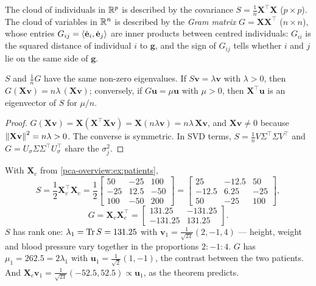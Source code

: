 \begin{notechapter}
The cloud of individuals in $\mathbb{R}^p$ is described by the covariance $S = \frac1n\mathbf X^\top\mathbf X$
($p\times p$). The cloud of variables in $\mathbb{R}^n$ is described by the \emph{Gram matrix}
$G = \mathbf X\mathbf X^\top$ ($n\times n$), whose entries $G_{ij} = \left\langle \dot{\mathbf e}_i, \dot{\mathbf e}_j \right\rangle$ are inner products
between centred individuals: $G_{ii}$ is the squared distance of individual $i$ to $\mathbf g$, and the sign of
$G_{ij}$ tells whether $i$ and $j$ lie on the same side of $\mathbf g$.

\begin{theorem}[Duality]\label{pca-overview:thm:duality}
$S$ and $\frac1nG$ have the same non-zero eigenvalues. If $S\mathbf v = \lambda\mathbf v$ with $\lambda>0$, then
$G(\mathbf X\mathbf v) = n\lambda\,(\mathbf X\mathbf v)$; conversely, if $G\mathbf u = \mu\mathbf u$ with $\mu>0$, then $\mathbf X^\top\mathbf u$ is an
eigenvector of $S$ for $\mu/n$.
\end{theorem}

\begin{proof}
$G(\mathbf X\mathbf v) = \mathbf X(\mathbf X^\top\mathbf X\mathbf v) = \mathbf X(n\lambda\mathbf v) = n\lambda\,\mathbf X\mathbf v$, and $\mathbf X\mathbf v\neq0$ because
$\left\|\mathbf X\mathbf v\right\|^2 = n\lambda>0$. The converse is symmetric. In SVD terms, $S = \frac1nV\Sigma^\top\Sigma V^\top$ and
$G = U_\sigma\Sigma\Sigma^\top U_\sigma^\top$ share the $\sigma_j^2$.
\end{proof}

\begin{example}
With $\mathbf X_c$ from \cref{pca-overview:ex:patients},
\[
  S = \frac12\mathbf X_c^\top\mathbf X_c = \frac12\begin{bmatrix}50 & -25 & 100\\ -25 & 12.5 & -50\\ 100 & -50 & 200\end{bmatrix}
    = \begin{bmatrix}25 & -12.5 & 50\\ -12.5 & 6.25 & -25\\ 50 & -25 & 100\end{bmatrix},
\]
\[
  G = \mathbf X_c\mathbf X_c^\top = \begin{bmatrix}131.25 & -131.25\\ -131.25 & 131.25\end{bmatrix}.
\]
$S$ has rank one: $\lambda_1 = \operatorname{Tr} S = 131.25$ with $\mathbf v_1 = \frac1{\sqrt{21}}(2,-1,4)$ --- height, weight and
blood pressure vary together in the proportions $2:-1:4$. $G$ has $\mu_1 = 262.5 = 2\lambda_1$ with
$\mathbf u_1 = \frac1{\sqrt2}(1,-1)$, the contrast between the two patients. And
$\mathbf X_c\mathbf v_1 = \frac1{\sqrt{21}}(-52.5, 52.5)\propto\mathbf u_1$, as the theorem predicts.
\end{example}


\end{notechapter}
